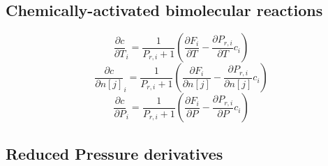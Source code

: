 \documentclass[a4paper,10pt]{article}
\begin{document}
\subsection{Chemically-activated bimolecular reactions}
\begin{dmath} \frac{\partial c }{\partial T }_{i} = \frac{1}{P_{r, i} + 1} \left(\frac{\partial F_{i} }{\partial T } - \frac{\partial P_{r, i} }{\partial T } c_{i}\right)\end{dmath} 
\begin{dmath} \frac{\partial c }{\partial n[j] }_{i} = \frac{1}{P_{r, i} + 1} \left(\frac{\partial F_{i} }{\partial n[j] } - \frac{\partial P_{r, i} }{\partial n[j] } c_{i}\right)\end{dmath} 
\begin{dmath} \frac{\partial c }{\partial P }_{i} = \frac{1}{P_{r, i} + 1} \left(\frac{\partial F_{i} }{\partial P } - \frac{\partial P_{r, i} }{\partial P } c_{i}\right)\end{dmath} 
\subsection{Reduced Pressure derivatives}
\end{document}
